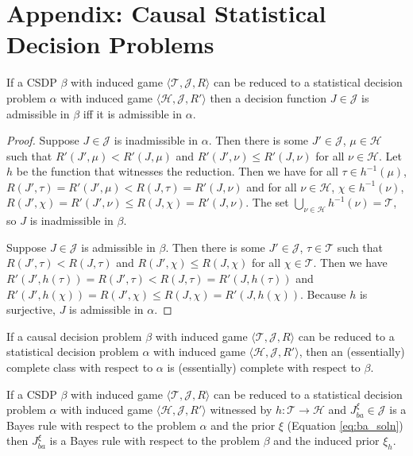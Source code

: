 \section{Appendix: Causal Statistical Decision Problems}\label{app:csdps}




\begin{lemma}\label{lem:red_adm_app}
If a CSDP $\beta$ with induced game $\langle \mathscr{T},\mathscr{J}, R\rangle$ can be reduced to a statistical decision problem $\alpha$ with induced game $\langle \mathscr{H},\mathscr{J},R' \rangle$ then a decision function $J\in \mathscr{J}$ is admissible in $\beta$ iff it is admissible in $\alpha$.
\end{lemma}


\begin{proof}
Suppose $J\in\mathscr{J}$ is inadmissible in $\alpha$. Then there is some $J'\in\mathscr{J}$, $\mu\in\mathscr{H}$ such that $R'(J',\mu)<R'(J,\mu)$ and $R'(J',\nu)\leq R'(J,\nu)$ for all $\nu\in \mathscr{H}$. Let $h$ be the function that witnesses the reduction. Then we have for all $\tau\in h^{-1}(\mu)$, $R(J',\tau)=R'(J',\mu)<R(J,\tau)=R'(J,\nu)$ and for all $\nu\in \mathscr{H}$, $\chi\in h^{-1}(\nu)$, $R(J',\chi)=R'(J',\nu)\leq R(J,\chi)=R'(J,\nu)$. The set $\bigcup_{\nu\in\mathscr{H}} h^{-1}(\nu)=\mathscr{T}$, so $J$ is inadmissible in $\beta$.

Suppose $J\in \mathscr{J}$ is admissible in $\beta$. Then there is some $J'\in\mathscr{J}$, $\tau\in\mathscr{T}$ such that $R(J',\tau)<R(J,\tau)$ and $R(J',\chi)\leq R(J,\chi)$ for all $\chi\in \mathscr{T}$. Then we have $R'(J',h(\tau))=R(J',\tau)<R(J,\tau)=R'(J,h(\tau))$ and $R'(J',h(\chi))=R(J',\chi)\leq R(J,\chi)=R'(J,h(\chi))$. Because $h$ is surjective, $J$ is admissible in $\alpha$.
\end{proof}

\begin{corollary}\label{cor:red_comp}
If a causal decision problem $\beta$ with induced game $\langle \mathscr{T},\mathscr{J}, R\rangle$ can be reduced to a statistical decision problem $\alpha$ with induced game $\langle \mathscr{H},\mathscr{J},R' \rangle$, then an (essentially) complete class with respect to $\alpha$ is (essentially) complete with respect to $\beta$.
\end{corollary}

\begin{lemma}\label{lem:IB_rule}
If a CSDP $\beta$ with induced game $\langle \mathscr{T},\mathscr{J}, R\rangle$ can be reduced to a statistical decision problem $\alpha$ with induced game $\langle \mathscr{H},\mathscr{J},R' \rangle$ witnessed by $h:\mathscr{T}\to\mathscr{H}$ and $J_{ba}^\xi\in \mathscr{J}$ is a Bayes rule with respect to the problem $\alpha$ and the prior $\xi$ (Equation \ref{eq:ba_soln}) then $J_{ba}^\xi$ is a Bayes rule with respect to the problem $\beta$ and the induced prior $\xi_h$.
\end{lemma}

